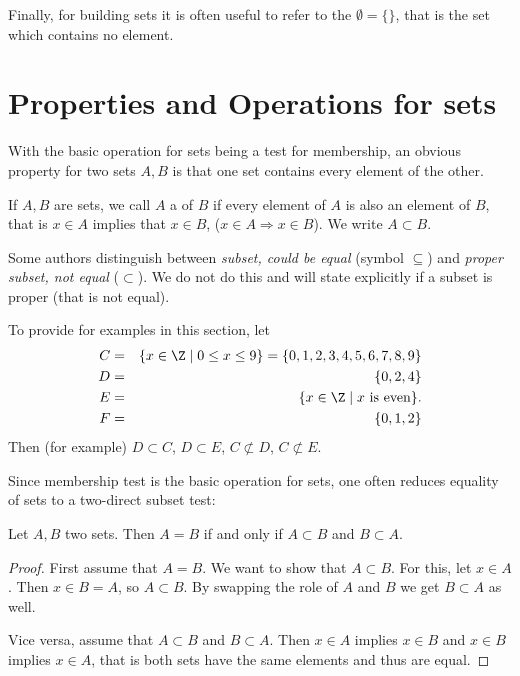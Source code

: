 Finally, for building sets it is often useful to refer to the  $\emptyset=\{\}$, that is the set which contains no element.

\section{Properties and Operations for sets}

With the basic operation for sets being a test for membership, an obvious
property for two sets $A,B$ is that one set contains every element of the
other.

\begin{defn}
If $A,B$ are sets, we call $A$ a  of $B$ if every element of
$A$ is also an element of $B$, that is $x\in A$ implies that $x\in B$,
($x\in A\Rightarrow x\in B$). We write $A\subset B$.
\end{defn}
\begin{note}
Some authors distinguish between {\em subset, could be equal} (symbol
$\subseteq$) and {\em proper subset, not equal} ($\subset$). We do not do
this and will state explicitly if a subset is proper (that is not equal).
\end{note}

To provide for examples in this section, let 
\begin{eqnarray*}
C&=&\{x\in\Z\mid 0\le x\le9\}=\{0,1,2,3,4,5,6,7,8,9\}\\
D&=&\{0,2,4\}\\
E&=&\{x\in\Z\mid \mbox{$x$ is even}\}.\\
F&=&\{0,1,2\}\\
\end{eqnarray*}
Then (for example) $D\subset C$, $D\subset E$, $C\not\subset D$,
$C\not\subset E$.

Since membership test is the basic operation for sets, one often reduces
equality of sets to a two-direct subset test:
\begin{lemma}
Let $A,B$ two sets. Then $A=B$ if and only if $A\subset B$ and $B\subset A$.
\end{lemma}
\begin{proof}
First assume that $A=B$. We want to show that $A\subset B$. For this, let
$x\in A$. Then $x\in B=A$, so $A\subset B$. By swapping the role of $A$ and
$B$ we get $B\subset A$ as well.

Vice versa, assume that $A\subset B$ and $B\subset A$. Then $x\in A$ implies
$x\in B$ and $x\in B$ implies $x\in A$, that is both sets have the same
elements and thus are equal.
\end{proof}

